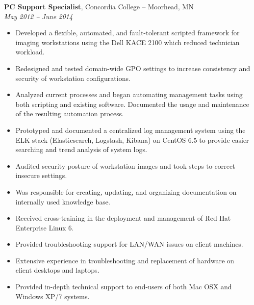 {\bf PC Support Specialist}, Concordia College -- Moorhead, MN\\
{\it May 2012 – June 2014}
\begin{itemize}
	\item Developed a flexible, automated, and fault-tolerant scripted framework for imaging workstations using the Dell KACE 2100 which reduced technician workload.
	\item Redesigned and tested domain-wide GPO settings to increase consistency and security of workstation configurations.
	\item Analyzed current processes and began automating management tasks using both scripting and existing software. Documented the usage and maintenance of the resulting automation process.
	\item Prototyped and documented a centralized log management system using the ELK stack (Elasticsearch, Logstash, Kibana) on CentOS 6.5 to provide easier searching and trend analysis of system logs.
	\item Audited security posture of workstation images and took steps to correct insecure settings.
	\item Was responsible for creating, updating, and organizing documentation on internally used knowledge base.
	\item Received cross-training in the deployment and management of Red Hat Enterprise Linux 6.
	\item Provided troubleshooting support for LAN/WAN issues on client machines.
	\item Extensive experience in troubleshooting and replacement of hardware on client desktops and laptops.
	\item Provided in-depth technical support to end-users of both Mac OSX and Windows XP/7 systems.
\end{itemize}